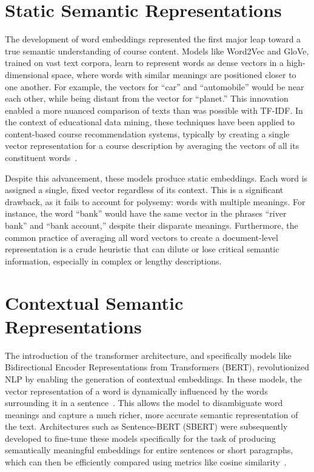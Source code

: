 \section{Static Semantic Representations}
The development of word embeddings represented the first major leap toward a true semantic understanding of course content. Models like Word2Vec and GloVe, trained on vast text corpora, learn to represent words as dense vectors in a high-dimensional space, where words with similar meanings are positioned closer to one another. For example, the vectors for ``car'' and ``automobile'' would be near each other, while being distant from the vector for ``planet.'' This innovation enabled a more nuanced comparison of texts than was possible with TF-IDF. In the context of educational data mining, these techniques have been applied to content-based course recommendation systems, typically by creating a single vector representation for a course description by averaging the vectors of all its constituent words~\cite{pardos10.1145/3330430.3333622}.

Despite this advancement, these models produce static embeddings. Each word is assigned a single, fixed vector regardless of its context. This is a significant drawback, as it fails to account for polysemy: words with multiple meanings. For instance, the word ``bank'' would have the same vector in the phrases ``river bank'' and ``bank account,'' despite their disparate meanings. Furthermore, the common practice of averaging all word vectors to create a document-level representation is a crude heuristic that can dilute or lose critical semantic information, especially in complex or lengthy descriptions.

\section{Contextual Semantic Representations}
The introduction of the transformer architecture, and specifically models like Bidirectional Encoder Representations from Transformers (BERT), revolutionized NLP by enabling the generation of contextual embeddings. In these models, the vector representation of a word is dynamically influenced by the words surrounding it in a sentence~\cite{devlin2019bertpretrainingdeepbidirectional}. This allows the model to disambiguate word meanings and capture a much richer, more accurate semantic representation of the text. Architectures such as Sentence-BERT (SBERT) were subsequently developed to fine-tune these models specifically for the task of producing semantically meaningful embeddings for entire sentences or short paragraphs, which can then be efficiently compared using metrics like cosine similarity~\cite{reimers-2019-sentence-bert}.

